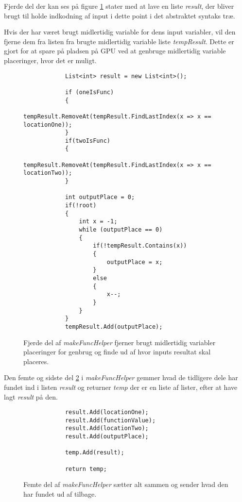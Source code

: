 Fjerde del der kan ses på figure \ref{fig:makeFuncHelper_part_4} stater med at lave en liste \textit{result}, der bliver brugt til holde indkodning af input i dette point i det abstraktet syntaks træ.

Hvis der har været brugt midlertidig variable for dens input variabler, vil den fjerne dem fra listen fra brugte midlertidig variable liste \textit{tempResult}. Dette er gjort for at spare på pladsen på GPU ved at genbruge midlertidig variable placeringer, hvor det er muligt.

\begin{figure}[!ht]
    \centering
    \lstset{style=sharpc}
	\begin{lstlisting}
            List<int> result = new List<int>();

            if (oneIsFunc)
            {
                tempResult.RemoveAt(tempResult.FindLastIndex(x => x == locationOne));
            }
            if(twoIsFunc)
            {
                tempResult.RemoveAt(tempResult.FindLastIndex(x => x == locationTwo));
            }

            int outputPlace = 0;
            if(!root)
            { 
                int x = -1;
                while (outputPlace == 0)
                {
                    if(!tempResult.Contains(x))
                    {
                        outputPlace = x;
                    }
                    else
                    {
                        x--;
                    }
                }
            }
            tempResult.Add(outputPlace);
	\end{lstlisting}
    \caption{Fjerde del af \textit{makeFuncHelper} fjerner brugt midlertidig variabler placeringer for genbrug og finde ud af hvor inputs resultat skal placeres.}
    \label{fig:makeFuncHelper_part_4}
\end{figure}

Den femte og sidste del \ref{fig:makeFuncHelper_part_5} i \textit{makeFuncHelper} gemmer hvad de tidligere dele har fundet ind i listen \textit{result} og returner \textit{temp}  der er en liste af lister, efter at have lagt \textit{result} på den.

\begin{figure}[!ht]
    \centering
    \lstset{style=sharpc}
	\begin{lstlisting}
            result.Add(locationOne);
            result.Add(functionValue);
            result.Add(locationTwo);
            result.Add(outputPlace);

            temp.Add(result);

            return temp;
	\end{lstlisting}
    \caption{Femte del af \textit{makeFuncHelper} sætter alt sammen og sender hvad den har fundet ud af tilbage.}
    \label{fig:makeFuncHelper_part_5}
\end{figure}

